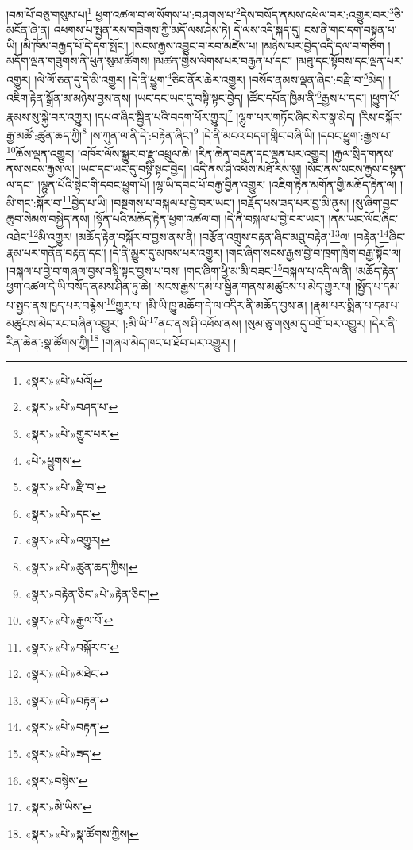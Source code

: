 །བམ་པོ་བཅུ་གསུམ་པ།\footnote{«སྣར་»«པེ་»པའོ།} ཕྱག་འཚལ་བ་ལ་སོགས་པ་:བཤགས་པ་\footnote{«སྣར་»«པེ་»བཤད་པ་}དེས་བསོད་ནམས་འཕེལ་བར་:འགྱུར་བར་\footnote{«སྣར་»«པེ་»གྱུར་པར་}ཅི་མངོན་ཞེ་ན། འཕགས་པ་སྤྱན་རས་གཟིགས་ཀྱི་མདོ་ལས་ཤེས་ཏེ། དེ་ལས་འདི་སྐད་དུ། ངས་ནི་གང་དག་བསྟན་པ་ཡི། །མི་ཁོམ་བརྒྱད་པོ་དེ་དག་སྤོང་། །སངས་རྒྱས་འབྱུང་བ་རབ་མཛེས་པ། །མཉེས་པར་བྱེད་འདི་དལ་བ་གཅིག །མདོག་ལྡན་གཟུགས་ནི་ཕུན་སུམ་ཚོགས། །མཚན་གྱིས་ལེགས་པར་བརྒྱན་པ་དང་། །མཐུ་དང་སྟོབས་དང་ལྡན་པར་འགྱུར། །ལེ་ལོ་ཅན་དུ་དེ་མི་འགྱུར། །དེ་ནི་ཕྱུག་\footnote{«པེ་»ཕྱུགས་}ཅིང་ནོར་ཆེར་འགྱུར། །བསོད་ནམས་ལྡན་ཞིང་:བརྫི་བ་\footnote{«སྣར་»«པེ་»རྫི་བ་}མེད། །འཇིག་རྟེན་སྒྲོན་མ་མཉེས་བྱས་ནས། །ཡང་དང་ཡང་དུ་བསྟི་སྟང་བྱེད། །ཚོང་དཔོན་ཁྱིམ་ནི་\footnote{«སྣར་»«པེ་»དང་}རྒྱས་པ་དང་། །ཕྱུག་པོ་རྣམས་སུ་སྐྱེ་བར་འགྱུར། །དཔའ་ཞིང་སྦྱིན་པའི་བདག་པོར་གྱུར།\footnote{«སྣར་»«པེ་»འགྱུར།} །ལྷུག་པར་གཏོང་ཞིང་སེར་སྣ་མེད། །རིས་བསྐོར་རྒྱ་མཚོ་:ཚུན་ཆད་ཀྱི།\footnote{«སྣར་»«པེ་»ཚུན་ཆད་ཀྱིས།} །ས་ཀུན་ལ་ནི་དེ་:བརྟེན་ཞིང་།\footnote{«སྣར་»བརྟེན་ཅིང་«པེ་»རྟེན་ཅིང་།} །དེ་ནི་མངའ་བདག་གླིང་བཞི་ཡི། །དབང་ཕྱུག་:རྒྱས་པ་\footnote{«སྣར་»«པེ་»རྒྱལ་པོ་}ཆོས་ལྡན་འགྱུར། །འཁོར་ལོས་སྒྱུར་བ་རྫུ་འཕྲུལ་ཆེ། །རིན་ཆེན་བདུན་དང་ལྡན་པར་འགྱུར། །རྒྱལ་སྲིད་གནས་ནས་སངས་རྒྱས་ལ། །ཡང་དང་ཡང་དུ་བསྟི་སྟང་བྱེད། །འདི་ནས་ཤི་འཕོས་མཐོ་རིས་སུ། །སོང་ནས་སངས་རྒྱས་བསྟན་ལ་དང་། །ལྷུན་པོའི་སྟེང་གི་དབང་ཕྱུག་པོ། །ལྷ་ཡི་དབང་པོ་བརྒྱ་བྱིན་འགྱུར། །འཇིག་རྟེན་མགོན་གྱི་མཆོད་རྟེན་ལ། །མི་གང་:སྐོར་བ་\footnote{«སྣར་»«པེ་»བསྐོར་བ་}བྱེད་པ་ཡི། །བསྔགས་པ་བསྐལ་པ་བྱེ་བར་ཡང་། །བརྗོད་པས་ཟད་པར་བྱ་མི་ནུས། །སུ་ཞིག་བྱང་ཆུབ་སེམས་བསྐྱེད་ནས། །སྟོན་པའི་མཆོད་རྟེན་ཕྱག་འཚལ་བ། །དེ་ནི་བསྐལ་པ་བྱེ་བར་ཡང་། །ནམ་ཡང་ལོང་ཞིང་འཐེང་\footnote{«སྣར་»«པེ་»མཐེང་}མི་འགྱུར། །མཆོད་རྟེན་བསྐོར་བ་བྱས་ནས་ནི། །བརྩོན་འགྲུས་བརྟན་ཞིང་མཐུ་བརྟེན་\footnote{«སྣར་»«པེ་»བརྟན་}ལ། །བརྟེན་\footnote{«སྣར་»«པེ་»བརྟན་}ཞིང་རྣམ་པར་གནོན་བརྟན་དང་། །དེ་ནི་མྱུར་དུ་མཁས་པར་འགྱུར། །གང་ཞིག་སངས་རྒྱས་བྱེ་བ་ཁྲག་ཁྲིག་བརྒྱ་སྟོང་ལ། །བསྐལ་པ་བྱེ་བ་གཞལ་བྱས་བསྟི་སྟང་བྱས་པ་བས། །གང་ཞིག་ཕྱི་མ་མི་བཟང་\footnote{«སྣར་»«པེ་»ཟད་}བསྐལ་པ་འདི་ལ་ནི། །མཆོད་རྟེན་ཕྱག་འཚལ་དེ་ཡི་བསོད་ནམས་ཤིན་ཏུ་ཆེ། །སངས་རྒྱས་དམ་པ་སྦྱིན་གནས་མཚུངས་པ་མེད་གྱུར་པ། །སྤྱོད་པ་དམ་པ་སྤྱད་ནས་ཁྱད་པར་བརྙེས་\footnote{«སྣར་»བསྙེས་}གྱུར་པ། །མི་ཡི་ཁྱུ་མཆོག་དེ་ལ་འདིར་ནི་མཆོད་བྱས་ན། །རྣམ་པར་སྨིན་པ་དམ་པ་མཚུངས་མེད་རང་བཞིན་འགྱུར། །:མི་ཡི་\footnote{«སྣར་»མི་ཡིས་}ནང་ནས་ཤི་འཕོས་ནས། །སུམ་ཅུ་གསུམ་དུ་འགྲོ་བར་འགྱུར། །དེར་ནི་རིན་ཆེན་:སྣ་ཚོགས་ཀྱི།\footnote{«སྣར་»«པེ་»སྣ་ཚོགས་ཀྱིས།} །གཞལ་མེད་ཁང་པ་ཐོབ་པར་འགྱུར། །
